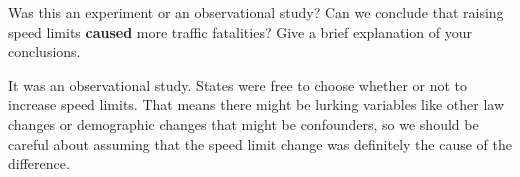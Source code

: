 \documentclass[12pt]{exam}
\begin{document}
\begin{questions}
\begin{solution}
\end{solution}
\question Was this an experiment or an observational study? Can we conclude that raising speed limits \textbf{caused} more traffic fatalities? Give a brief explanation of your conclusions. 
\begin{solution}
It was an observational study.  States were free to choose whether or not to increase speed limits.  That means there might be lurking variables like other law changes or demographic changes that might be confounders, so we should be careful about assuming that the speed limit change was definitely the cause of the difference.  
\end{solution}

\end{questions}
\end{document}
